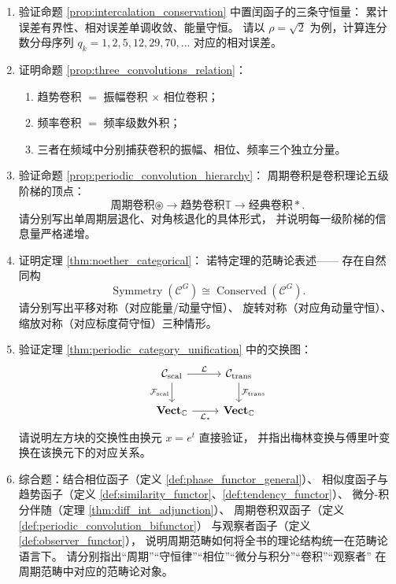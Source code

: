 \begin{enumerate}[leftmargin=3em, label=\textbf{题 \arabic*}]
    \item 验证命题 \ref{prop:intercalation_conservation} 中置闰函子的三条守恒量：
    累计误差有界性、相对误差单调收敛、能量守恒。
    请以 $\rho=\sqrt{2}$ 为例，计算连分数分母序列 $q_k=1,2,5,12,29,70,\dots$
    对应的相对误差。

    \item 证明命题 \ref{prop:three_convolutions_relation}：
    \begin{enumerate}[label=(\roman*)]
        \item 趋势卷积 $=$ 振幅卷积 $\times$ 相位卷积；
        \item 频率卷积 $=$ 频率级数外积；
        \item 三者在频域中分别捕获卷积的振幅、相位、频率三个独立分量。
    \end{enumerate}

    \item 验证命题 \ref{prop:periodic_convolution_hierarchy}：
    周期卷积是卷积理论五级阶梯的顶点：
    \[
    \text{周期卷积}\circledast\to
    \text{趋势卷积}\mathbb{T}\to
    \text{经典卷积}*.
    \]
    请分别写出单周期层退化、对角核退化的具体形式，
    并说明每一级阶梯的信息量严格递增。

    \item 证明定理 \ref{thm:noether_categorical}：
    诺特定理的范畴论表述——
    存在自然同构
    \[
    \operatorname{Symmetry}(\mathcal{C}^G)\cong\operatorname{Conserved}(\mathcal{C}^G).
    \]
    请分别写出平移对称（对应能量/动量守恒）、
    旋转对称（对应角动量守恒）、
    缩放对称（对应标度荷守恒）三种情形。

    \item 验证定理 \ref{thm:periodic_category_unification} 中的交换图：
    \[
    \begin{tikzcd}
    \mathcal{C}_{\text{scal}} \arrow[r,"\mathcal{L}"] \arrow[d,"\mathcal{F}_{\text{scal}}"']
    & \mathcal{C}_{\text{trans}} \arrow[d,"\mathcal{F}_{\text{trans}}"] \\
    \mathbf{Vect}_{\mathbb{C}} \arrow[r,"\mathcal{L}_*"']
    & \mathbf{Vect}_{\mathbb{C}}
    \end{tikzcd}
    \]
    请说明左方块的交换性由换元 $x=e^t$ 直接验证，
    并指出梅林变换与傅里叶变换在该换元下的对应关系。

    \item 综合题：结合相位函子（定义 \ref{def:phase_functor_general}）、
    相似度函子与趋势函子（定义 \ref{def:similarity_functor}、\ref{def:tendency_functor}）、
    微分-积分伴随（定理 \ref{thm:diff_int_adjunction}）、
    周期卷积双函子（定义 \ref{def:periodic_convolution_bifunctor}）
    与观察者函子（定义 \ref{def:observer_functor}），
    说明周期范畴如何将全书的理论结构统一在范畴论语言下。
    请分别指出“周期”“守恒律”“相位”“微分与积分”“卷积”“观察者”
    在周期范畴中对应的范畴论对象。
\end{enumerate}

